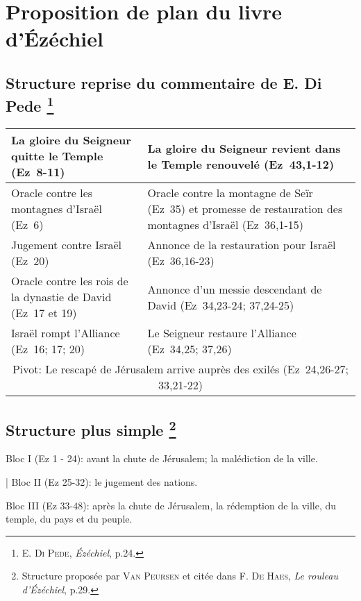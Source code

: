 \section*{Proposition de plan du livre d'Ézéchiel}
\subsection*{Structure reprise du commentaire de E. Di Pede
    \footnote{\textsc{E. Di Pede}, \textit{Ézéchiel}, p.24.}
}

\leftskip=1.5cm
\begin{tabular}{|m{7cm}|m{7cm}|}
    \hline
    La gloire du Seigneur quitte le Temple (Ez~8-11)
     & La gloire du Seigneur revient dans le Temple renouvelé (Ez~43,1-12) \tabularnewline
    \hline
    Oracle contre les montagnes d'Israël (Ez~6)
     & Oracle contre la montagne de Seïr (Ez~35) et promesse de restauration des montagnes d'Israël (Ez~36,1-15) \tabularnewline
    \hline
    Jugement contre Israël (Ez~20)
     & Annonce de la restauration pour Israël (Ez~36,16-23) \tabularnewline
    \hline
    Oracle contre les rois de la dynastie de David (Ez~17 et 19)
     & Annonce d'un messie descendant de David (Ez~34,23-24; 37,24-25) \tabularnewline
    \hline
    Israël rompt l'Alliance (Ez~16; 17; 20)
     & Le Seigneur restaure l'Alliance (Ez~34,25; 37,26) \tabularnewline
    \hline
    \multicolumn{2}{|c|}{Pivot: Le rescapé de Jérusalem arrive auprès des exilés (Ez~24,26-27; 33,21-22)} \tabularnewline
    \hline
\end{tabular}

\leftskip=0cm

\vspace{2em}
\subsection*{Structure plus simple
    \footnote{Structure proposée par \textsc{Van Peursen} et citée dans \textsc{F. De Haes}, \textit{Le rouleau d'Ézéchiel}, p.29.}
}

\leftskip=1.5cm

Bloc I (Ez 1 - 24): avant la chute de Jérusalem; la malédiction de la ville.\par
\decalage | Bloc II (Ez 25-32): le jugement des nations.\par
Bloc III (Ez 33-48): après la chute de Jérusalem, la rédemption de la ville, du temple, du pays et du peuple.

\leftskip=0cm